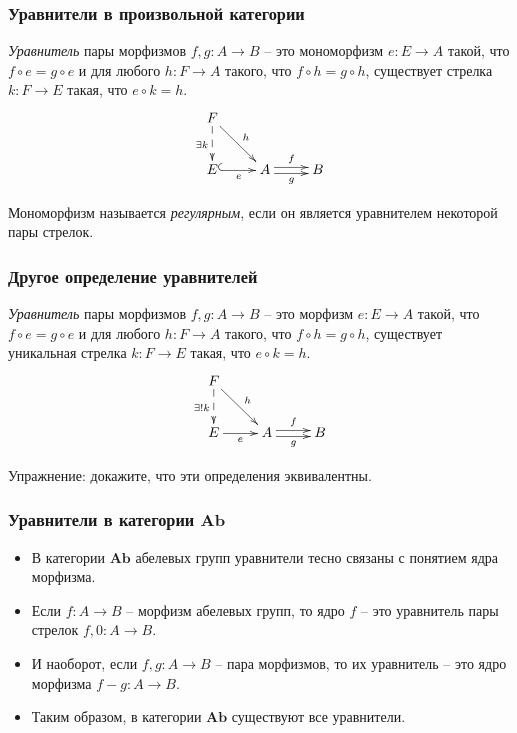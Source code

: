 \documentclass{beamer}
\theoremstyle{definition}
\newcommand{\cat}[1]{\mathbf{#1}}
\newcommand{\Ab}{\cat{Ab}}
\begin{document}
\begin{frame}
\frametitle{Уравнители в произвольной категории}
\emph{Уравнитель} пары морфизмов $f, g : A \to B$ -- это мономорфизм $e : E \to A$ такой, что $f \circ e = g \circ e$ и для любого $h : F \to A$ такого, что $f \circ h = g \circ h$, существует стрелка $k : F \to E$ такая, что $e \circ k = h$.
\[ \xymatrix{ F \ar@{-->}[d]_{\exists k} \ar[dr]^h \\
              E \ar@{^{(}->}[r]_e & A \ar@<-.5ex>[r]_g \ar@<.5ex>[r]^f & B
            } \]

Мономорфизм называется \emph{регулярным}, если он является уравнителем некоторой пары стрелок.
\end{frame}

\begin{frame}
\frametitle{Другое определение уравнителей}
\emph{Уравнитель} пары морфизмов $f, g : A \to B$ -- это морфизм $e : E \to A$ такой, что $f \circ e = g \circ e$ и для любого $h : F \to A$ такого, что $f \circ h = g \circ h$, существует уникальная стрелка $k : F \to E$ такая, что $e \circ k = h$.
\[ \xymatrix{ F \ar@{-->}[d]_{\exists ! k} \ar[dr]^h \\
              E \ar[r]_e & A \ar@<-.5ex>[r]_g \ar@<.5ex>[r]^f & B
            } \]

Упражнение: докажите, что эти определения эквивалентны.
\end{frame}

\begin{frame}
\frametitle{Уравнители в категории $\Ab$}
\begin{itemize}
\item В категории $\Ab$ абелевых групп уравнители тесно связаны с понятием ядра морфизма.
\item Если $f : A \to B$ -- морфизм абелевых групп, то ядро $f$ -- это уравнитель пары стрелок $f, 0 : A \to B$.
\item И наоборот, если $f, g : A \to B$ -- пара морфизмов, то их уравнитель -- это ядро морфизма $f - g : A \to B$.
\item Таким образом, в категории $\Ab$ существуют все уравнители.
\end{itemize}
\end{frame}
\end{document}
